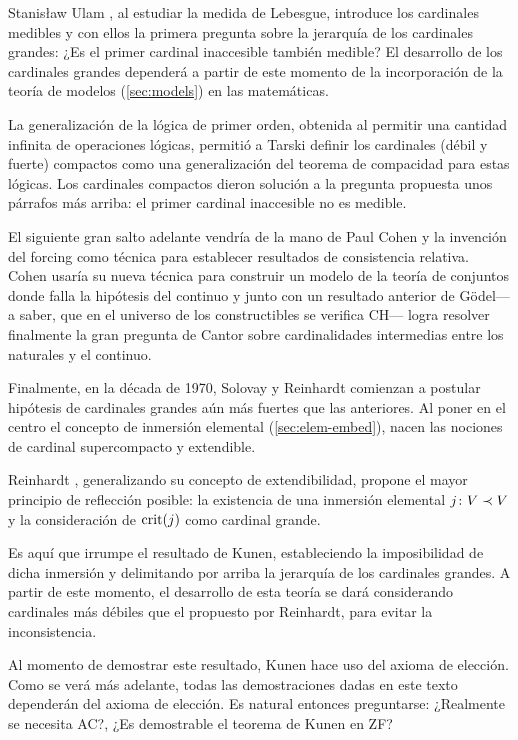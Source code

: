 Stanisław Ulam \autocite{ulam_zur_1930}, al estudiar la medida de Lebesgue,
introduce los cardinales medibles y con ellos la primera
pregunta sobre la jerarquía de los cardinales grandes:
¿Es el primer cardinal inaccesible también medible?
El desarrollo de los cardinales grandes dependerá a partir de este
momento de la incorporación de la teoría de modelos (\ref{sec:models}) en las matemáticas.

La generalización de la lógica de primer orden, obtenida al
permitir una cantidad infinita de operaciones lógicas,
permitió a Tarski \autocite{tarski_problems_1966} definir los cardinales (débil y fuerte)
compactos como una generalización del teorema de compacidad
para estas lógicas. Los cardinales compactos dieron solución
a la pregunta propuesta unos párrafos más arriba:
el primer cardinal inaccesible no es medible.

El siguiente gran salto adelante vendría de la mano de
Paul Cohen \autocite{cohen_independence_1963,cohen_independence_1964}
y la invención del forcing como técnica
para establecer resultados de consistencia relativa.
Cohen usaría su nueva técnica para construir un modelo de la
teoría de conjuntos donde falla la hipótesis del continuo
y junto con un resultado anterior de Gödel---a saber, que
en el universo de los constructibles se verifica CH---%
logra resolver finalmente la gran pregunta de Cantor sobre cardinalidades
intermedias entre los naturales y el continuo.

Finalmente, en la década de 1970,
Solovay y Reinhardt comienzan a postular
hipótesis de cardinales grandes aún más fuertes
que las anteriores.
Al poner en el centro el concepto de inmersión elemental
(\ref{sec:elem-embed}),
nacen las nociones de cardinal supercompacto y extendible.

Reinhardt \autocite{reinhardt_ackermanns_1970},
generalizando su concepto de extendibilidad,
propone el mayor principio de reflección posible:
la existencia de una inmersión elemental $j\colon V\prec V$
y la consideración de $\operatorname{crit} (j)$ como cardinal grande.

Es aquí que irrumpe el resultado de Kunen,
estableciendo la imposibilidad de dicha inmersión
y delimitando por arriba la jerarquía de los cardinales
grandes. A partir de este momento, el desarrollo
de esta teoría se dará considerando cardinales más
débiles que el propuesto por Reinhardt,
para evitar la inconsistencia.

Al momento de demostrar este resultado, Kunen hace
uso del axioma de elección. Como se verá
más adelante, todas las demostraciones dadas en este texto
dependerán del axioma de elección.
Es natural entonces preguntarse: ¿Realmente se necesita AC?,
¿Es demostrable el teorema de Kunen en ZF?

